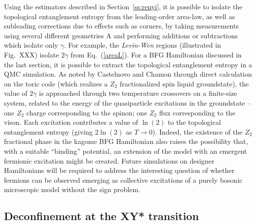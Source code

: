 \documentclass[range]{ar2e}
\begin{document}

Using the estimators described in Section~\ref{ss:renyi}, it is possible to isolate the topological entanglement entropy from the leading-order area-law, as well as subleading corrections due to effects such as corners, by taking measurements using several different geometries A and performing additions or subtractions which isolate only $\gamma$.  For example, the {\it Levin-Wen} \cite{LW} regions (illustrated in Fig.~XXX) isolate $2\gamma$ from Eq.~(\ref{areaL}).  For a BFG Hamiltonian discussed in the last section, it is possible to extract the topological entanglement entropy in a QMC simulation.  As noted by Castelnovo and Chamon \cite{castelnovo} through direct calculation on the toric code (which realizes a $Z_2$ fractionalized spin liquid groundstate), the value of $2\gamma$ is approached through two temperature crossovers on a finite-size system, related to the energy of the quasiparticle excitations in the groundstate -- one $Z_2$ charge corresponding to the spinon; one $Z_2$ flux corresponding to the vison.  Each excitation contributes a value of $\ln(2)$ to the topological entanglement entropy (giving $2\ln(2)$ as $T \rightarrow 0$).  Indeed, the existence of the $Z_2$ fractional phase in the kagome BFG Hamiltonian also raises the possibility that, with a suitable ``binding'' potential, an extension of the model with an emergent fermionic excitation might be created.  
Future simulations on designer Hamiltonians will be required to address the interesting question of whether fermions can be observed emerging as collective excitations of a purely bosonic microscopic model without the sign problem.

\subsection{Deconfinement at the XY* transition} \label{XYstar}
\end{document}
